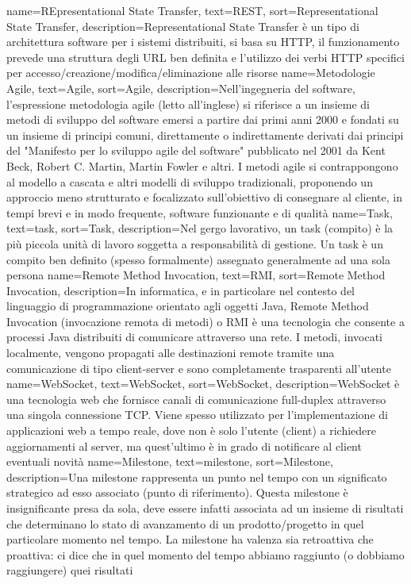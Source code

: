 {
	name=REpresentational State Transfer,
	text=REST,
	sort=Representational State Transfer,
	description={Representational State Transfer è un tipo di architettura software per i sistemi distribuiti, si basa su HTTP, il funzionamento prevede una struttura degli URL ben definita e l’utilizzo dei verbi HTTP specifici per accesso/creazione/modifica/eliminazione alle risorse}
}
{
	name=Metodologie Agile,
	text=Agile,
	sort=Agile,
	description={Nell'ingegneria del software, l'espressione metodologia agile (letto all'inglese) si riferisce a un insieme di metodi di sviluppo del software emersi a partire dai primi anni 2000 e fondati su un insieme di principi comuni, direttamente o indirettamente derivati dai principi del "Manifesto per lo sviluppo agile del software" pubblicato nel 2001 da Kent Beck, Robert C. Martin, Martin Fowler e altri. I metodi agile si contrappongono al modello a cascata e altri modelli di sviluppo tradizionali, proponendo un approccio meno strutturato e focalizzato sull'obiettivo di consegnare al cliente, in tempi brevi e in modo frequente, software funzionante e di qualità}
}
{
	name=Task,
	text=task,
	sort=Task,
	description={Nel gergo lavorativo, un task (compito) è la più piccola unità di lavoro soggetta a responsabilità di gestione. Un task è un compito ben definito (spesso formalmente) assegnato generalmente ad una sola persona}
}
{
	name=Remote Method Invocation,
	text=RMI,
	sort=Remote Method Invocation,
	description={In informatica, e in particolare nel contesto del linguaggio di programmazione orientato agli oggetti Java, Remote Method Invocation (invocazione remota di metodi) o RMI è una tecnologia che consente a processi Java distribuiti di comunicare attraverso una rete. I metodi, invocati localmente, vengono propagati alle destinazioni remote tramite una comunicazione di tipo client-server e sono completamente trasparenti all'utente}
}
{
	name=WebSocket,
	text=WebSocket,
	sort=WebSocket,
	description={WebSocket è una tecnologia web che fornisce canali di comunicazione full-duplex attraverso una singola connessione TCP. Viene spesso utilizzato per l'implementazione di applicazioni web a tempo reale, dove non è solo l'utente (client) a richiedere aggiornamenti al server, ma quest'ultimo è in grado di notificare al client eventuali novità}
}
{
	name=Milestone,
	text=milestone,
	sort=Milestone,
	description={Una milestone rappresenta un punto nel tempo con un significato strategico ad esso associato (punto di riferimento). Questa milestone è insignificante presa da sola, deve essere infatti associata ad un insieme di risultati che determinano lo stato di avanzamento di un prodotto/progetto in quel particolare momento nel tempo. La milestone ha valenza sia retroattiva che proattiva: ci dice che in quel momento del tempo abbiamo raggiunto (o dobbiamo raggiungere) quei risultati}
}